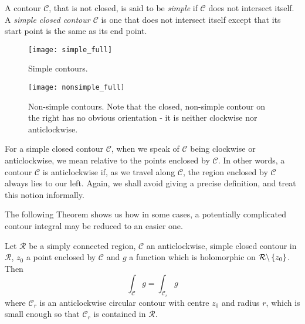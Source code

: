 \begin{definition}
A contour $\mathcal{C}$, that is not closed, is said to be \emph{simple} if $\mathcal{C}$ does not intersect itself.  A \emph{simple closed contour $\mathcal{C}$} is one that does not intersect itself except that its start point is the same as its end point.
\end{definition}

\begin{figure}[h]
\centering
\texttt{[image: simple\_full]}
\caption{Simple contours.}
\end{figure}
\begin{figure}[h]
\centering
\texttt{[image: nonsimple\_full]}
\caption{Non-simple contours.  Note that the closed, non-simple contour on the right has no obvious orientation - it is neither clockwise nor anticlockwise.}
\end{figure}


For a simple closed contour $\mathcal{C}$, when we speak of $\mathcal{C}$ being clockwise or anticlockwise, we mean relative to the points enclosed by $\mathcal{C}$.  In other words, a contour $\mathcal{C}$ is anticlockwise if, as we travel along $\mathcal{C}$, the region enclosed by $\mathcal{C}$ always lies to our left.  Again, we shall avoid giving a precise definition, and treat this notion informally.



%



The following Theorem shows us how in some cases, a potentially complicated contour integral may be reduced to an easier one.
\begin{theorem}
\label{t:sc}
Let $\mathcal{R}$ be a simply connected region, $\mathcal{C}$ an anticlockwise, simple closed contour in $\mathcal{R}$, $z_0$ a point enclosed by $\mathcal{C}$ and $g$ a function which is holomorphic on $\mathcal{R} \backslash \left\{z_0\right\}$.  Then
\[
\int_{\mathcal{C}} g = \int_{\mathcal{C}_r} g
\]
where $\mathcal{C}_r$ is an anticlockwise circular contour with centre $z_0$ and radius $r$, which is small enough so that $\mathcal{C}_r$ is contained in $\mathcal{R}$.
\end{theorem}

